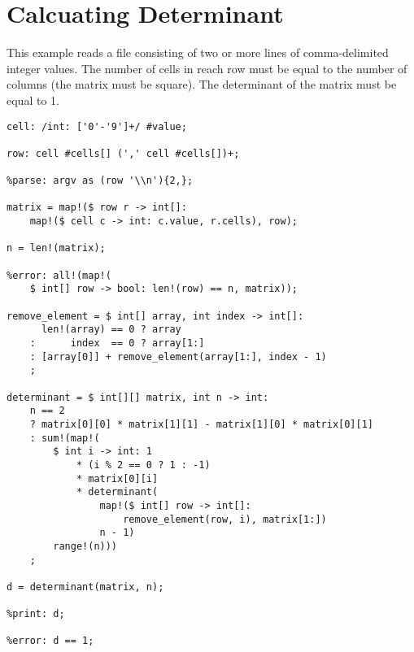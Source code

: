 
\section{Calcuating Determinant}
{

This example reads a file consisting of two or more lines of comma-delimited
integer values. The number of cells in reach row must be equal to the
number of columns (the matrix must be square).
The determinant of the matrix must be equal to 1.

\begin{lstlisting}[texcl=true, language=MAIA]
cell: /int: ['0'-'9']+/ #value;

row: cell #cells[] (',' cell #cells[])+;

%parse: argv as (row '\\n'){2,};

matrix = map!($ row r -> int[]:
	map!($ cell c -> int: c.value, r.cells), row);

n = len!(matrix);

%error: all!(map!(
	$ int[] row -> bool: len!(row) == n, matrix));

remove_element = $ int[] array, int index -> int[]:
	  len!(array) == 0 ? array
	:      index  == 0 ? array[1:]
	: [array[0]] + remove_element(array[1:], index - 1)
	;

determinant = $ int[][] matrix, int n -> int:
	n == 2
	? matrix[0][0] * matrix[1][1] - matrix[1][0] * matrix[0][1]
	: sum!(map!(
		$ int i -> int: 1
			* (i % 2 == 0 ? 1 : -1)
			* matrix[0][i]
			* determinant(
				map!($ int[] row -> int[]: 
					remove_element(row, i), matrix[1:])
				n - 1)
		range!(n)))
	;

d = determinant(matrix, n);

%print: d;

%error: d == 1;
\end{lstlisting}
}














